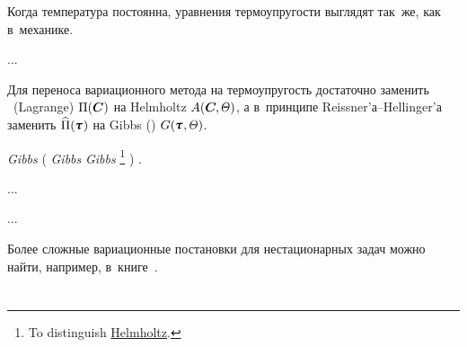 \begin{otherlanguage}{russian}

Когда
температура
постоянна,
уравнения термоупругости
выглядят
так~же, как
в~механике.

...

Для переноса вариационного метода на термоупругость достаточно заменить ~(Lagrange)  ${\Pi (\bm{C})}$ на Helmholtz ${A(\bm{C}\hspace{-0.12ex}, \temperaturefield)}$, а в~принципе Reissner’а--Hellinger’а заменить ${\widehat{\potentialenergydensity}(\hspace{-0.1ex}\cauchystress\hspace{.12ex})}$ на Gibbs () ${G(\hspace{-0.1ex}\cauchystress\hspace{.12ex}, \temperaturefield)}$.

{} \emph{Gibbs}
(%
  \emph{Gibbs}
  \emph{Gibbs}
  \emph{}%
  \footnote{%
    To distinguish
    \href{https://en.wikipedia.org/wiki/Helmholtz_free_energy}{Helmholtz}.%
  }%
)
\ru{,}
\href{https://en.wikipedia.org/wiki/Reversible_process_(thermodynamics)}{}\ru{,}
.

...

...

Более сложные вариационные постановки для нестационарных задач можно найти, например, в~книге~\cite{belyaev.ryadno}.

\end{otherlanguage}

\section*{\small \wordforbibliography}

